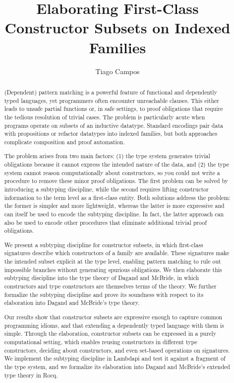 \documentclass[a4paper, anonymous, UKenglish,cleveref, autoref, thm-restate]{lipics-v2021}
\title{Elaborating First-Class Constructor Subsets on Indexed Families}
\author{Tiago Campos}{UFMG, Brazil}{camposferreiratiago@gmail.com}{https://orcid.org/0000-0002-1825-0097}{}
\begin{document}
\maketitle

\begin{abstract}
(Dependent) pattern matching is a powerful feature of functional and dependently typed languages, yet programmers often encounter unreachable clauses. This either leads to unsafe partial functions or, in safe settings, to proof obligations that require the tedious resolution of trivial cases. The problem is particularly acute when programs operate on subsets of an inductive datatype. Standard encodings pair data with propositions or refactor datatypes into indexed families, but both approaches complicate composition and proof automation.

The problem arises from two main factors: (1) the type system generates trivial obligations because it cannot express the intended nature of the data, and (2) the type system cannot reason computationally about constructors, so you could not write a procedure to remove these minor proof obligations.
The first problem can be solved by introducing a subtyping discipline, while the second requires lifting constructor information to the term level as a first-class entity. Both solutions address the problem: the former is simpler and more lightweight, whereas the latter is more expressive and can itself be used to encode the subtyping discipline. In fact, the latter approach can also be used to encode other procedures that eliminate additional trivial proof obligations.

We present a subtyping discipline for constructor subsets, in which first-class signatures describe which constructors of a family are available. These signatures make the intended subset explicit at the type level, enabling pattern matching to rule out impossible branches without generating spurious obligations. We then elaborate this subtyping discipline into the type theory of Dagand and McBride, in which constructors and type constructors are themselves terms of the theory.
We further formalize the subtyping discipline and prove its soundness with respect to its elaboration into Dagand and McBride's type theory.

Our results show that constructor subsets are expressive enough to capture common programming idioms, and that extending a dependently typed language with them is simple.
Through the elaboration, constructor subsets can be expressed in a purely computational setting, which enables reusing constructors in different type constructors, deciding about constructors, and even set-based operations on signatures.
We implement the subtyping discipline in Lambdapi and test it against a fragment of the type system, and we formalize its elaboration into Dagand and McBride's extended type theory in Rocq.

\end{abstract}
\end{document}
